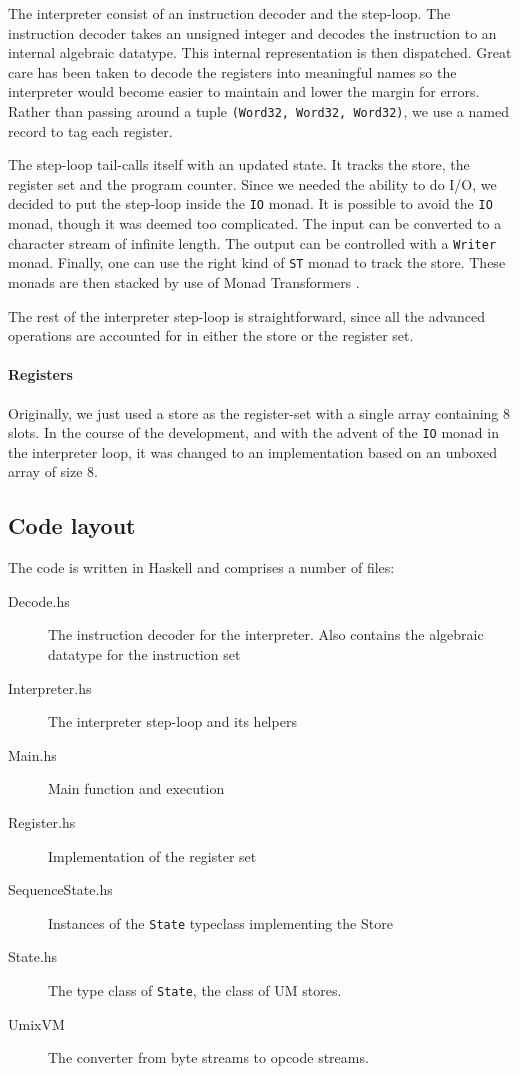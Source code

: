 The interpreter consist of an instruction decoder and the
step-loop. The instruction decoder takes an unsigned integer and
decodes the instruction to an internal algebraic datatype. This
internal representation is then dispatched. Great care has been taken to
decode the registers into meaningful names so the interpreter would
become easier to maintain and lower the margin for errors. Rather than
passing around a tuple \texttt{(Word32, Word32, Word32)}, we use a
named record to tag each register.

The step-loop tail-calls itself with an updated state. It tracks the
store, the register set and the program counter. Since we needed the
ability to do I/O, we decided to put the step-loop inside the
\texttt{IO} monad. It is possible to avoid the \texttt{IO}
monad, though it was deemed too complicated. The input can be
converted to a character stream of infinite length. The output can be
controlled with a \texttt{Writer} monad. Finally, one can use the
right kind of \texttt{ST} monad to track the store. These monads are
then stacked by use of Monad Transformers \cite{monad+transformer}.

The rest of the interpreter step-loop is straightforward, since all
the advanced operations are accounted for in either the store or the
register set.

\paragraph{Registers}
\label{sec:registers}

Originally, we just used a store as the register-set with a single
array containing 8 slots. In the course of the development, and with
the advent of the \texttt{IO} monad in the interpreter loop, it was
changed to an implementation based on an unboxed array of size 8.

\subsection*{Code layout}

The code is written in Haskell and comprises a number of files:
\begin{description}
\item[Decode.hs] The instruction decoder for the interpreter. Also
  contains the algebraic datatype for the instruction set
\item[Interpreter.hs] The interpreter step-loop and its helpers
\item[Main.hs] Main function and execution
\item[Register.hs] Implementation of the register set
\item[SequenceState.hs] Instances of the \texttt{State} typeclass
  implementing the Store
\item[State.hs] The type class of \texttt{State}, the class of UM stores.
\item[UmixVM] The converter from byte streams to opcode streams.
\end{description}
